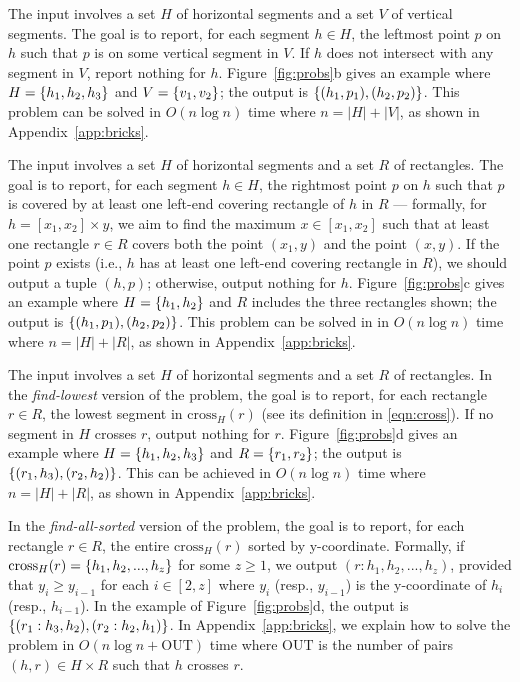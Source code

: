 \documentclass[sigconf]{acmart}
\def\vgap{\vspace{0mm}}
\def\extraspacing{\vspace{1.5mm} \noindent}
\def\cross{\mathrm{cross}}
\def\out{\mathrm{OUT}}
\begin{document}
\extraspacing {\bf Problem $\bm{\mathscr{B}}$.} The input involves a set $H$ of horizontal segments and a set $V$ of vertical segments. The goal is to report, for each segment $h \in H$, the leftmost point $p$ on $h$ such that $p$ is on some vertical segment in $V$. If $h$ does not intersect with any segment in $V$, report nothing for $h$. Figure~\ref{fig:probs}b gives an example where $H = \{h_1, h_2, h_3\}$ and $V = \{v_1, v_2\}$; the output is $\{(h_1, p_1), (h_2, p_2)\}$. This problem can be solved in $O(n \log n)$ time where $n = |H| + |V|$, as shown in Appendix~\ref{app:bricks}.


\extraspacing {\bf Problem $\bm{\mathscr{C}}$.} The input involves a set $H$ of horizontal segments and a set $R$ of rectangles. The goal is to report, for each segment $h \in H$, the rightmost point $p$ on $h$ such that $p$ is covered by at least one left-end covering rectangle of $h$ in $R$ --- formally, for $h = [x_1, x_2] \times y$, we aim to find the maximum $x \in [x_1, x_2]$ such that at least one rectangle $r \in R$ covers both the point $(x_1, y)$ and the point $(x, y)$. If the point $p$ exists (i.e., $h$ has at least one left-end covering rectangle in $R$), we should output a tuple $(h, p)$; otherwise, output nothing for $h$. Figure~\ref{fig:probs}c gives an example where $H = \{h_1, h_2\}$ and $R$ includes the three rectangles shown; the output is $\{(h_1, p_1), (h_2, p_2)\}$. This problem can be solved in in $O(n \log n)$ time where $n = |H| + |R|$, as shown in Appendix~\ref{app:bricks}.

\extraspacing {\bf Problem $\bm{\mathscr{D}}$.} The input involves a set $H$ of horizontal segments and a set $R$ of rectangles. In the {\em find-lowest} version of the problem, the goal is to report, for each rectangle $r \in R$, the lowest segment in $\cross_H(r)$ (see its definition in \eqref{eqn:cross}). If no segment in $H$ crosses $r$, output nothing for $r$.  Figure~\ref{fig:probs}d gives an example where $H = \{h_1, h_2, h_3\}$ and $R = \{r_1, r_2\}$; the output is $\{(r_1, h_3), (r_2, h_2)\}$. This can be achieved in $O(n \log n)$ time where $n = |H| + |R|$, as shown in Appendix~\ref{app:bricks}.

\vgap

In the {\em find-all-sorted} version of the problem, the goal is to report, for each rectangle $r \in R$, the entire $\cross_H(r)$ sorted by y-coordinate. Formally, if $\cross_H(r) = \set{h_1, h_2, ..., h_z}$ for some $z \ge 1$, we output $(r: h_1, h_2, ..., h_z)$, provided that $y_i \ge y_{i-1}$ for each $i \in [2, z]$ where $y_i$ (resp., $y_{i-1}$) is the y-coordinate of $h_i$ (resp., $h_{i-1}$). In the example of Figure~\ref{fig:probs}d, the output is $\{(r_1: h_3, h_2), (r_2: h_2, h_1)\}$. In Appendix~\ref{app:bricks}, we explain how to solve the problem in $O(n \log n + \out)$ time where $\out$ is the number of pairs $(h, r) \in H \times R$ such that $h$ crosses $r$.
\end{document}
